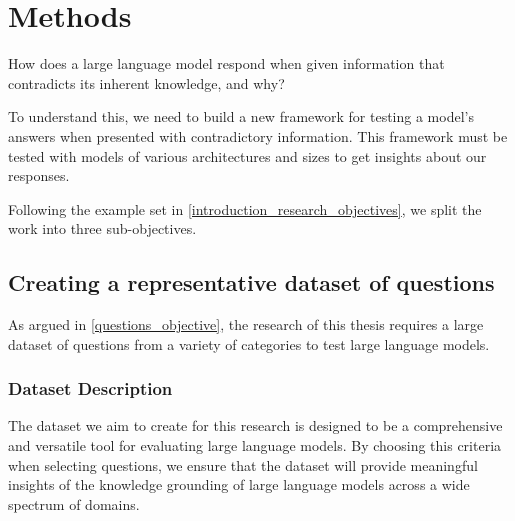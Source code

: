 \section{Methods}

How does a large language model respond when given information that contradicts its inherent knowledge, and why?

To understand this, we need to build a new framework for testing a model's answers when presented with contradictory information.
This framework must be tested with models of various architectures and sizes to get insights about our responses.

Following the example set in \cref{introduction_research_objectives}, we split the work into three sub-objectives.

\subsection{Creating a representative dataset of questions}
\label{creating_dataset}

As argued in \cref{questions_objective}, the research of this thesis requires a large dataset of questions from a variety of categories to test large language models.

\subsubsection{Dataset Description}

The dataset we aim to create for this research is designed to be a comprehensive and versatile tool for evaluating large language models.
By choosing this criteria when selecting questions, we ensure that the dataset will provide meaningful insights of the knowledge grounding of large language models across a wide spectrum of domains.

